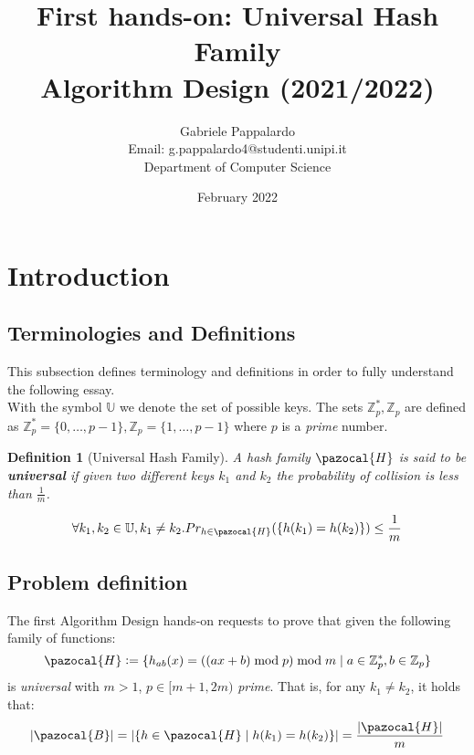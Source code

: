 \documentclass{article}
\title{First hands-on: Universal Hash Family\\[1ex] \large Algorithm Design (2021/2022)}
\author{Gabriele Pappalardo\\Email: g.pappalardo4@studenti.unipi.it\\Department of Computer Science}
\date{February 2022}
\newcommand{\defeq}{\vcentcolon=}
\newcommand{\Hb}{\pazocal{H}}
\newcommand{\Bb}{\pazocal{B}}
\newtheorem{definition*}[theorem]{Definition}
\begin{document}
\maketitle

\section{Introduction}

\subsection{Terminologies and Definitions}

This subsection defines terminology and definitions in order to fully understand the following essay.\\

\noindent With the symbol $\mathbb{U}$ we denote the set of possible keys. The sets $\mathbb{Z}_p^*, \mathbb{Z}_p$ are defined as $\mathbb{Z}_p^* = \{0, \dots, p - 1\}, \mathbb{Z}_p = \{1, \dots, p - 1\}$ where $p$ is a \textit{prime} number.

\begin{definition*}[Universal Hash Family]
A hash family $\Hb$ is said to be \textbf{universal} if given two different keys $k_1$ and $k_2$ the probability of collision is less than $\frac{1}{m}$.

$$
\forall k_1, k_2 \in \mathbb{U}, k_1 \ne k_2 .Pr_{h \in \Hb}(\{h(k_1) = h(k_2)\}) \le \frac{1}{m}
$$

\end{definition*}

\subsection{Problem definition}

The first Algorithm Design hands-on requests to prove that given the following family of functions:
$$
\Hb \defeq \{ h_{ab}(x) = ((ax + b) \bmod p) \bmod m \mid a \in \mathbb{Z}_p^*, b \in \mathbb{Z}_p \}
$$
is \textit{universal} with $m > 1$, $p \in [m + 1, 2m)$ \textit{prime}. That is, for any $k_1 \ne k_2$, it holds that:
$$
|\Bb| = |\{h \in \Hb \mid h(k_1) = h(k_2) \}| = \frac{|\Hb|}{m}
$$
\end{document}
